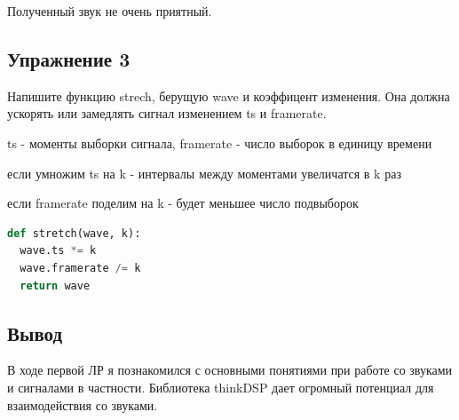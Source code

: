 Полученный звук не очень приятный.


\subsection{Упражнение 3}

Напишите функцию strech, берущую wave и коэффицент изменения. Она должна ускорять или замедлять сигнал изменением ts и framerate.

\noindent ts - моменты выборки сигнала, framerate - число выборок в единицу времени

\noindent если умножим ts на k - интервалы между моментами увеличатся в k раз

\noindent если framerate поделим на k - будет меньшее число подвыборок

\begin{lstlisting}[language=Python]
def stretch(wave, k):
  wave.ts *= k
  wave.framerate /= k
  return wave 
\end{lstlisting}


\subsection{Вывод}
В ходе первой ЛР я познакомился с основными понятиями при работе со звуками и сигналами в частности. Библиотека thinkDSP дает огромный потенциал для взаимодействия со звуками.